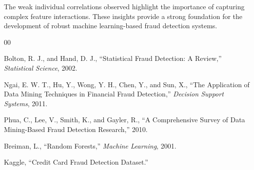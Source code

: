 \documentclass[conference]{IEEEtran}
\begin{document}
The weak individual correlations observed highlight the importance of capturing complex feature interactions. These insights provide a strong foundation for the development of robust machine learning-based fraud detection systems.

\begin{thebibliography}{00}

 Bolton, R. J., and Hand, D. J., ``Statistical Fraud Detection: A Review,'' \textit{Statistical Science}, 2002.

 Ngai, E. W. T., Hu, Y., Wong, Y. H., Chen, Y., and Sun, X., ``The Application of Data Mining Techniques in Financial Fraud Detection,'' \textit{Decision Support Systems}, 2011.

 Phua, C., Lee, V., Smith, K., and Gayler, R., ``A Comprehensive Survey of Data Mining-Based Fraud Detection Research,'' 2010.

 Breiman, L., ``Random Forests,'' \textit{Machine Learning}, 2001.

 Kaggle, ``Credit Card Fraud Detection Dataset.''

\end{thebibliography}
\end{document}
